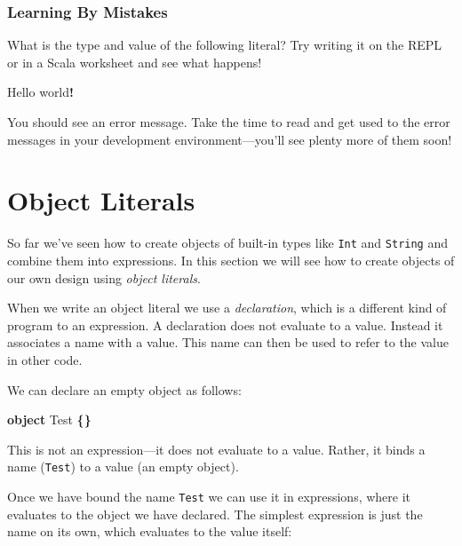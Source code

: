 \documentclass[11pt,a5paper,]{book}
\newenvironment{Shaded}{\begin{snugshade}}{\end{snugshade}}
\newcommand{\ErrorTok}[1]{\textcolor[rgb]{0.64,0.00,0.00}{\textbf{#1}}}
\newcommand{\KeywordTok}[1]{\textcolor[rgb]{0.13,0.29,0.53}{\textbf{#1}}}
\newcommand{\NormalTok}[1]{#1}
\newcommand{\OperatorTok}[1]{\textcolor[rgb]{0.81,0.36,0.00}{\textbf{#1}}}
\begin{document}
\hypertarget{learning-by-mistakes}{%
\subsubsection{Learning By Mistakes}\label{learning-by-mistakes}}

What is the type and value of the following literal? Try writing it on
the REPL or in a Scala worksheet and see what happens!

\begin{Shaded}
\begin{Highlighting}[]
\ErrorTok{\textquotesingle{}}\NormalTok{Hello world}\OperatorTok{!}\ErrorTok{\textquotesingle{}}
\end{Highlighting}
\end{Shaded}

You should see an error message. Take the time to read and get used to
the error messages in your development environment---you'll see plenty
more of them soon!

\hypertarget{object-literals}{%
\section{Object Literals}\label{object-literals}}

So far we've seen how to create objects of built-in types like
\texttt{Int} and \texttt{String} and combine them into expressions. In
this section we will see how to create objects of our own design using
\emph{object literals}.

When we write an object literal we use a \emph{declaration}, which is a
different kind of program to an expression. A declaration does not
evaluate to a value. Instead it associates a name with a value. This
name can then be used to refer to the value in other code.

We can declare an empty object as follows:

\begin{Shaded}
\begin{Highlighting}[]
\KeywordTok{object}\NormalTok{ Test }\OperatorTok{\{\}}
\end{Highlighting}
\end{Shaded}

This is not an expression---it does not evaluate to a value. Rather, it
binds a name (\texttt{Test}) to a value (an empty object).

Once we have bound the name \texttt{Test} we can use it in expressions,
where it evaluates to the object we have declared. The simplest
expression is just the name on its own, which evaluates to the value
itself:
\end{document}
